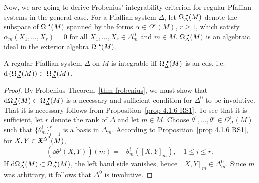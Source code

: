 Now, we are going to derive Frobenius' integrability criterion for regular Pfaffian systems in the general case. For a Pfaffian system $\Delta$, let $\Omega^{\smbullet }_\Delta(M)$ denote the subspace of $\Omega^{\smbullet }(M)$ spanned by the forms $\alpha\in\Omega^r(M)$, $r\geq 1$, which satisfy $\alpha_m(X_1,\ldots,X_r)=0$ for all $X_1,\ldots,X_r\in \Delta^0_m$ and $m\in M$. $\Omega^{\smbullet }_\Delta(M)$ is an algebraic ideal in the exterior algebra $\Omega^{\smbullet }(M)$.

\begin{thm}\label{thm 4.7.8 RS1}
    A regular Pfaffian system $\Delta$ on $M$ is integrable iff $\Omega^{\smbullet }_\Delta(M)$ is an \gls{eds}, i.e.\ $\dd \left(\Omega^{\smbullet }_\Delta(M)\right)\subset \Omega^{\smbullet }_\Delta(M)$.
\end{thm}
\begin{proof}
    By Frobenius Theorem~\ref{thm frobenius}, we must show that $\dd\Omega^{\smbullet }_\Delta(M)\subset \Omega^{\smbullet }_\Delta(M)$ is a necessary and sufficient condition for $\Delta^0$ to be involutive. That it is necessary follows from Proposition~\ref{prop 4.1.6 RS1}. To see that it is sufficient, let $r$ denote the rank of $\Delta$ and let $m\in M$. Choose $\theta^1,\ldots,\theta^r\in \Omega^1_\Delta(M)$ such that $\{\theta^i_m\}_{i=1}^r$ is a basis in $\Delta_m$. According to Proposition~\ref{prop 4.1.6 RS1}, for $X,Y\in\mathfrak{X}^{\Delta^0}(M)$, 
    \[\left(\dd \theta^j(X,Y)\right)(m)=-\theta^i_m([X,Y]_m),\quad 1\leq i\leq r.\]
    If $\dd\Omega^{\smbullet }_\Delta(M)\subset\Omega^{\smbullet }_\Delta(M)$, the left hand side vanishes, hence $[X,Y]_m\in\Delta_m^0$. Since $m$ was arbitrary, it follows that $\Delta^0$ is involutive.
\end{proof}

